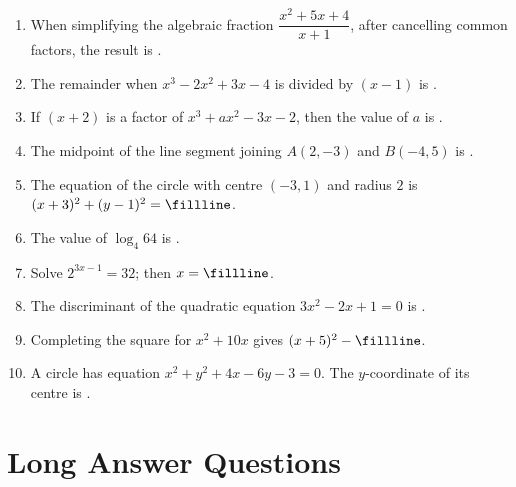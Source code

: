 \documentclass{sbs-exam}
\begin{document}
\begin{enumerate}
    \item When simplifying the algebraic fraction $\dfrac{x^2+5x+4}{x+1}$, after cancelling common factors, the result is \fillline.

    \item The remainder when $x^3-2x^2+3x-4$ is divided by $(x-1)$ is \fillline.

    \item If $(x+2)$ is a factor of $x^3+ax^2-3x-2$, then the value of $a$ is \fillline.

    \item The midpoint of the line segment joining $A(2,-3)$ and $B(-4,5)$ is \fillline.

    \item The equation of the circle with centre $(-3,1)$ and radius $2$ is $(x+3)^2+(y-1)^2 = \fillline$.

    \item The value of $\log_4 64$ is \fillline.

    \item Solve $2^{3x-1}=32$; then $x = \fillline$.

    \item The discriminant of the quadratic equation $3x^2-2x+1=0$ is \fillline.

    \item Completing the square for $x^2+10x$ gives $(x+5)^2 - \fillline$.

    \item A circle has equation $x^2+y^2+4x-6y-3=0$. The $y$-coordinate of its centre is \fillline.
\end{enumerate}

\newpage

\section*{Long Answer Questions}
\end{document}
